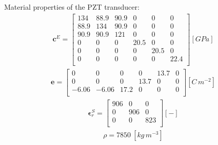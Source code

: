 \documentclass[materials,article,submit,moreauthors,pdftex]{Definitions/mdpi}
\begin{document}
Material properties of the PZT transducer:
\begin{eqnarray}
\textbf{c}^E=\left [ 
\begin{array}{cccccc}
134 & 88.9 & 90.9 & 0 & 0 & 0 \\ 
88.9 & 134 & 90.9 & 0 & 0 & 0 \\
90.9 & 90.9 & 121 & 0 & 0 & 0 \\
0 & 0 & 0 & 20.5 & 0 & 0 \\
0 & 0 & 0 & 0 & 20.5 & 0 \\
0 & 0 & 0 & 0 & 0 & 22.4 \nonumber \\
\end{array}
\right ] \left [ GPa \right ] 
\end{eqnarray}
\begin{eqnarray}
\textbf{e}=\left[
\begin{array}{cccccc}
0 & 0 & 0 & 0 & 13.7 & 0\\
0 & 0 & 0 & 13.7 & 0 & 0\\
-6.06 & -6.06 & 17.2 & 0 & 0 & 0\nonumber \\
\end{array}
\right] \left[C\,m^{-2}\right]
\end{eqnarray}
\begin{eqnarray}
\boldsymbol{\epsilon}^S_r=\left[
\begin{array}{ccc}
906 & 0 & 0\\
0 & 906 & 0\\
0 & 0 & 823\nonumber \\
\end{array}
\right] \left[ - \right]
\end{eqnarray}
\begin{eqnarray}
\rho=7850\ [kg\,m^{-3}] \nonumber
\end{eqnarray}


{}

\end{document}

